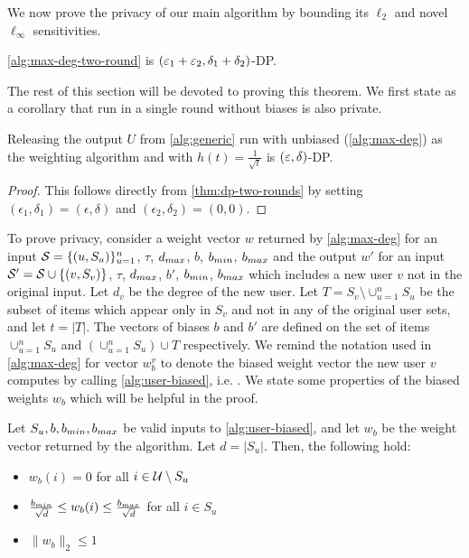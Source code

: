 We now prove the privacy of our main algorithm by bounding its $\ell_2$ and novel $\ell_\infty$ sensitivities.
\begin{theorem}\label{thm:dp-two-rounds}
\cref{alg:max-deg-two-round} is $(\varepsilon_1 + \varepsilon_2, \delta_1 + \delta_2)$-DP.
\end{theorem}

The rest of this section will be devoted to proving this theorem. We first state as a corollary that \ouralgo{} run in a single round without biases is also private.

\begin{corollary}\label{thm:dp-one-round}
Releasing the output $U$ from \cref{alg:generic} run with unbiased \ouralgo{} (\cref{alg:max-deg}) as the weighting algorithm and with $h(t) = \frac{1}{\sqrt{t}}$ is $(\varepsilon, \delta)$-DP.
\end{corollary}
\begin{proof}
This follows directly from \cref{thm:dp-two-rounds} by setting $(\epsilon_1, \delta_1) = (\epsilon, \delta)$ and $(\epsilon_2, \delta_2) = (0,0)$.
\end{proof}

To prove privacy, consider a weight vector $w$ returned by \cref{alg:max-deg} for an input $\mathcal{S} = \{(u, S_u)\}_{u=1}^n$, $\tau$, $d_{max}$, $b$, $b_{min}$, $b_{max}$ and the output $w'$ for an input $\mathcal{S}' = \mathcal{S} \cup \{(v, S_v)\}$, $\tau$, $d_{max}$, $b'$, $b_{min}$, $b_{max}$ which includes a new user $v$ not in the original input.
Let $d_v$ be the degree of the new user.
Let $T = S_v \setminus \cup_{u=1}^n S_u$ be the subset of items which appear only in $S_v$ and not in any of the original user sets, and let $t = |T|$. The vectors of biases $b$ and $b'$ are defined on the set of items $\cup_{u=1}^n S_u$ and 
$\left(\cup_{u=1}^n S_u \right) \cup T$ respectively. 
We remind the notation used in \cref{alg:max-deg} for vector $w^v_b$ to denote the biased weight vector the new user $v$ computes by calling \cref{alg:user-biased}, i.e. \userweights.
We state some properties of the biased weights $w_b$ which will be helpful in the proof.
\begin{lemma}\label{lem:l2-bound-user-weights}
Let $S_u, b, b_{min}, b_{max}$ be valid inputs to \cref{alg:user-biased}, and let $w_b$ be the weight vector returned by the algorithm.
Let $d = |S_u|$.
Then, the following hold:
\begin{itemize}
    \item $w_b(i) = 0$ for all $i \in \mathcal{U} \setminus S_u$
    \item $\frac{b_{min}}{\sqrt{d}} \leq w_b(i) \leq \frac{b_{max}}{\sqrt{d}}$ for all $i \in S_u$
    \item $\|w_b\|_2 \leq 1$
\end{itemize}
\end{lemma}

